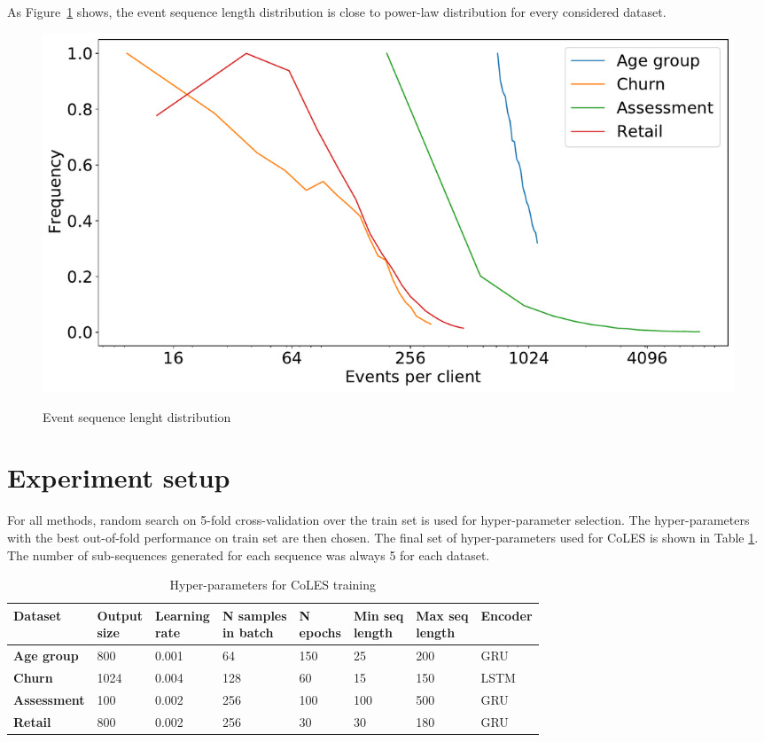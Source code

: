 \documentclass{article}
\begin{document}
As Figure~\ref{fig-seq-len} shows, the event sequence length distribution is close to power-law distribution for every considered dataset.

\begin{figure}
  \centering
  \caption{Event sequence lenght distribution}
  \includegraphics[width=\linewidth]{figures/all_scenario_events_per_client.pdf}
  \label{fig-seq-len}
\end{figure}

\section{Experiment setup} \label{app-sec-exp-setup}

For all methods, random search on 5-fold cross-validation over the train set is used for hyper-parameter selection. The hyper-parameters with the best out-of-fold performance on train set are then chosen. The final set of hyper-parameters used for CoLES is shown in Table \ref{tab-hyper}. The number of sub-sequences generated for each sequence was always 5 for each dataset.

\begin{table}
\centering
\caption{Hyper-parameters for CoLES training}
\begin{tabular}{llllllll}
\toprule
\textbf{Dataset} & \makecell[l]{\textbf{Output} \\ \textbf{size}} & \makecell[l]{\textbf{Learning} \\ \textbf{rate}} & \makecell[l]{\textbf{N samples} \\ \textbf{in batch}} & \makecell[l]{\textbf{N} \\ \textbf{epochs}} & \makecell[l]{\textbf{Min seq} \\ \textbf{length}} & \makecell[l]{\textbf{Max seq} \\ \textbf{length}} & \textbf{Encoder} \\
\midrule
\textbf{Age group} & 800 & 0.001 & 64 & 150 & 25 & 200 & GRU \\
\textbf{Churn} & 1024 & 0.004 & 128 & 60 & 15 & 150 & LSTM \\
\textbf{Assessment} & 100 & 0.002 & 256 & 100 & 100 & 500 & GRU \\
\textbf{Retail} & 800 & 0.002 & 256 & 30 & 30 & 180& GRU \\
\bottomrule
\end{tabular}
\label{tab-hyper}
\end{table}
\end{document}
